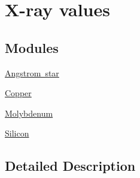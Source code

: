 \hypertarget{group___n_i_s_t_const-_x-ray}{}\section{X-\/ray values}
\label{group___n_i_s_t_const-_x-ray}
\subsection*{Modules}
\begin{DoxyCompactItemize}
\item 
\mbox{\hyperlink{group___n_i_s_t_const-_angstrom_star}{Angstrom star}}
\item 
\mbox{\hyperlink{group___n_i_s_t_const-_copper}{Copper}}
\item 
\mbox{\hyperlink{group___n_i_s_t_const-_molybdenum}{Molybdenum}}
\item 
\mbox{\hyperlink{group___n_i_s_t_const-_silicon}{Silicon}}
\end{DoxyCompactItemize}


\subsection{Detailed Description}
